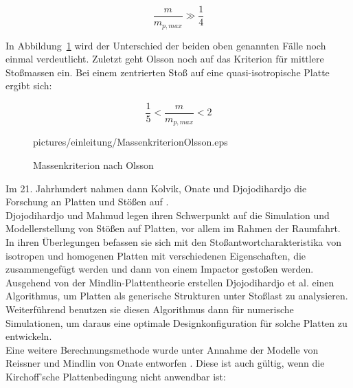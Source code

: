 \begin{equation}
	\frac{m}{m_{p,max}} \gg \frac{1}{4}
\end{equation}

In Abbildung~\ref{fig:Olsson} wird der Unterschied der beiden oben genannten Fälle noch einmal verdeutlicht. Zuletzt geht Olsson noch auf das Kriterion für mittlere Stoßmassen ein. Bei einem zentrierten Stoß auf eine quasi-isotropische Platte ergibt sich:

\begin{equation}
	\frac{1}{5} < \frac{m}{m_{p,max}} < 2
\end{equation}


\begin{figure}[H]
	\begin{center}
		\begin{overpic}[width=\linewidth]{pictures/einleitung/MassenkriterionOlsson.eps}
					
		\end{overpic}	
		\caption{Massenkriterion nach Olsson}	
		\label{fig:Olsson}
	\end{center}
\end{figure}


Im 21. Jahrhundert nahmen dann Kolvik, Onate und Djojodihardjo die Forschung an Platten und Stößen auf \cite{Kolvik.May2012} \cite{Onate.} \cite{Djojodihardjo.2015}.\\
Djojodihardjo und Mahmud\cite{Djojodihardjo.2015} legen ihren Schwerpunkt auf die Simulation und Modellerstellung von Stößen auf Platten, vor allem im Rahmen der Raumfahrt. In ihren Überlegungen befassen sie sich mit den Stoßantwortcharakteristika von isotropen und homogenen Platten mit verschiedenen Eigenschaften, die zusammengefügt werden und dann von einem Impactor gestoßen werden. Ausgehend von der Mindlin-Plattentheorie erstellen Djojodihardjo et al. einen Algorithmus, um Platten als generische Strukturen unter Stoßlast zu analysieren. Weiterführend benutzen sie diesen Algorithmus dann für numerische Simulationen, um daraus eine optimale Designkonfiguration für solche Platten zu entwickeln.\\
Eine weitere Berechnungsmethode wurde unter Annahme der Modelle von Reissner und Mindlin von Onate entworfen \cite{Onate.}. Diese ist auch gültig, wenn die Kirchoff'sche Plattenbedingung nicht anwendbar ist:

